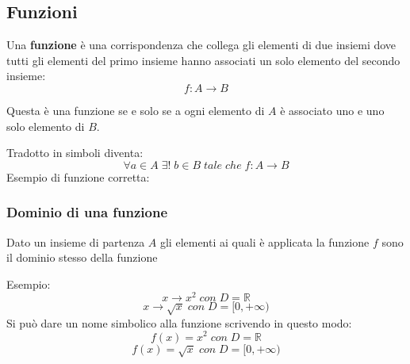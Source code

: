 \documentclass[a4paper]{article}
\theoremstyle{break}
\theoremstyle{break}
\theoremstyle{break}
\theoremstyle{break}
\begin{document}
\subsection{Funzioni}
\begin{definition}
	Una \textbf{funzione} è una corrispondenza che collega gli elementi di due insiemi dove tutti
	gli elementi del primo insieme hanno associati un solo elemento del secondo insieme:
	\[
		f: A \to B
	\]
\end{definition}
Questa è una funzione se e solo se a ogni elemento di \( A \) è associato uno e uno solo elemento di \( B \).

Tradotto in simboli diventa:
\[
	\forall a \in A \;\exists !\; b \in B \;tale\;che\; f: A \to B
\]
Esempio di funzione corretta:
\begin{center}
\end{center}

\subsubsection{Dominio di una funzione}
\begin{definition}
	Dato un insieme di partenza \( A \) gli elementi ai quali è applicata la funzione \( f \) sono
	il dominio stesso della funzione
\end{definition}
Esempio:
\[
	x \to x^2\; con\; D=\mathbb{R}
\] \[
	x \to \sqrt{x}\; con\; D=[0,+\infty)
\]
Si può dare un nome simbolico alla funzione scrivendo in questo modo:
\[
	f(x)=x^2\; con\; D=\mathbb{R}
\] \[
	f(x)=\sqrt{x}\; con\; D=[0,+\infty)
\]
\end{document}

